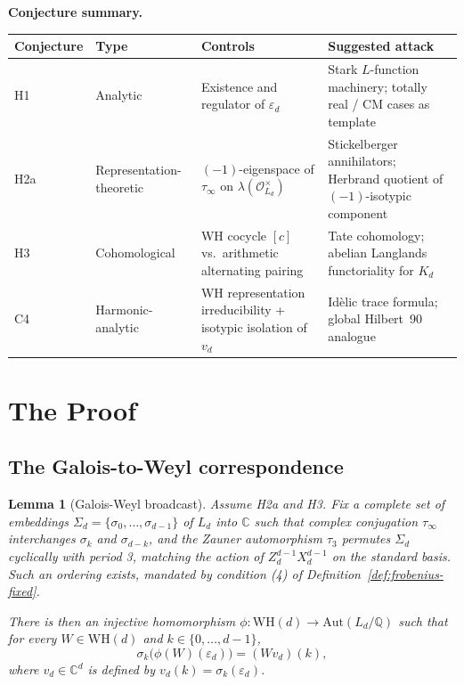 \documentclass[12pt]{article}
\theoremstyle{plain}
\newtheorem{lemmainner}[theoreminner]{Lemma}
\theoremstyle{definition}
\theoremstyle{remark}
\newenvironment{lemma}{\begin{mdframed}[style=thmstyle]\begin{lemmainner}}{\end{lemmainner}\end{mdframed}}
\newcommand{\WH}{\mathrm{WH}}
\newcommand{\OO}{\mathcal{O}}
\newcommand{\eps}{\varepsilon}
\newcommand{\bQ}{\mathbb{Q}}
\newcommand{\bC}{\mathbb{C}}
\begin{document}
\medskip
\noindent\textbf{Conjecture summary.}

\begin{center}
\renewcommand{\arraystretch}{1.35}
\begin{tabular}{@{} l l p{3.6cm} p{4.2cm} @{}}
\toprule
\textbf{Conjecture} & \textbf{Type} & \textbf{Controls} & \textbf{Suggested attack} \\
\midrule
H1 & Analytic & Existence and regulator of $\eps_d$ & Stark $L$-function machinery; totally real / CM cases as template \\
H2a & Representation-theoretic & $(-1)$-eigenspace of $\tau_\infty$ on $\lambda(\OO_{L_d}^\times)$ & Stickelberger annihilators; Herbrand quotient of $(-1)$-isotypic component \\
H3 & Cohomological & WH cocycle $[c]$ vs.\ arithmetic alternating pairing & Tate cohomology; abelian Langlands functoriality for $K_d$ \\
C4 & Harmonic-analytic & WH representation irreducibility + isotypic isolation of $v_d$ & Id\`{e}lic trace formula; global Hilbert~90 analogue \\
\bottomrule
\end{tabular}
\end{center}

\section{The Proof}
\label{sec:proof}

\subsection{The Galois-to-Weyl correspondence}

\begin{lemma}[Galois-Weyl broadcast]
  \label{lem:galois-weyl}
  Assume H2a and H3. Fix a complete set of embeddings $\Sigma_d = \{\sigma_0, \ldots, \sigma_{d-1}\}$ of $L_d$ into $\bC$ such that complex conjugation $\tau_\infty$ interchanges $\sigma_k$ and $\sigma_{d-k}$, and the Zauner automorphism $\tau_3$ permutes $\Sigma_d$ cyclically with period 3, matching the action of $Z_d^{d-1} X_d^{d-1}$ on the standard basis. Such an ordering exists, mandated by condition (4) of Definition~\ref{def:frobenius-fixed}.

  There is then an injective homomorphism $\phi : \WH(d) \to \mathrm{Aut}(L_d/\bQ)$ such that for every $W \in \WH(d)$ and $k \in \{0, \ldots, d-1\}$,
  \[
    \sigma_k\!\bigl(\phi(W)(\eps_d)\bigr) = (W v_d)(k),
  \]
  where $v_d \in \bC^d$ is defined by $v_d(k) = \sigma_k(\eps_d)$.
\end{lemma}
\end{document}
